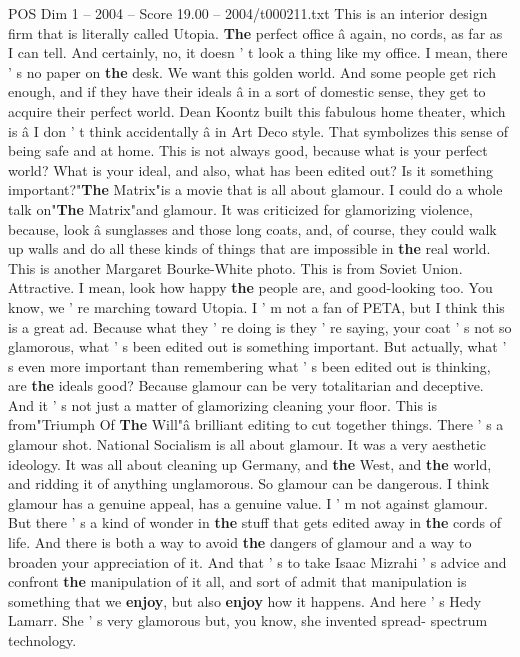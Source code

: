 \begin{textsample}{POS Dim 1 – 2004 – Score 19.00 – 2004/t000211.txt}
This is an interior design firm that is literally called Utopia. \textbf{The} perfect office â again, no cords, as far as I can tell.
And certainly, no, it doesn ' t look a thing like my office.
I mean, there ' s no paper on \textbf{the} desk.
We want this golden world.
And some people get rich enough, and if they have their ideals â in a sort of domestic sense, they get to acquire their perfect world.
Dean Koontz built this fabulous home theater, which is â I don ' t think accidentally â in Art Deco style.
That symbolizes this sense of being safe and at home.
This is not always good, because what is your perfect world?
What is your ideal, and also, what has been edited out?
Is it something important?"\textbf{The} Matrix"is a movie that is all about glamour.
I could do a whole talk on"\textbf{The} Matrix"and glamour.
It was criticized for glamorizing violence, because, look â sunglasses and those long coats, and, of course, they could walk up walls and do all these kinds of things that are impossible in \textbf{the} real world.
This is another Margaret Bourke-White photo.
This is from Soviet Union.
Attractive.
I mean, look how happy \textbf{the} people are, and good-looking too.
You know, we ' re marching toward Utopia.
I ' m not a fan of PETA, but I think this is a great ad.
Because what they ' re doing is they ' re saying, your coat ' s not so glamorous, what ' s been edited out is something important.
But actually, what ' s even more important than remembering what ' s been edited out is thinking, are \textbf{the} ideals good?
Because glamour can be very totalitarian and deceptive.
And it ' s not just a matter of glamorizing cleaning your floor.
This is from"Triumph Of \textbf{The} Will"â brilliant editing to cut together things.
There ' s a glamour shot.
National Socialism is all about glamour.
It was a very aesthetic ideology.
It was all about cleaning up Germany, and \textbf{the} West, and \textbf{the} world, and ridding it of anything unglamorous.
So glamour can be dangerous.
I think glamour has a genuine appeal, has a genuine value.
I ' m not against glamour.
But there ' s a kind of wonder in \textbf{the} stuff that gets edited away in \textbf{the} cords of life.
And there is both a way to avoid \textbf{the} dangers of glamour and a way to broaden your appreciation of it.
And that ' s to take Isaac Mizrahi ' s advice and confront \textbf{the} manipulation of it all, and sort of admit that manipulation is something that we \textbf{enjoy}, but also \textbf{enjoy} how it happens.
And here ' s Hedy Lamarr.
She ' s very glamorous but, you know, she invented spread- spectrum technology.

\end{textsample}
